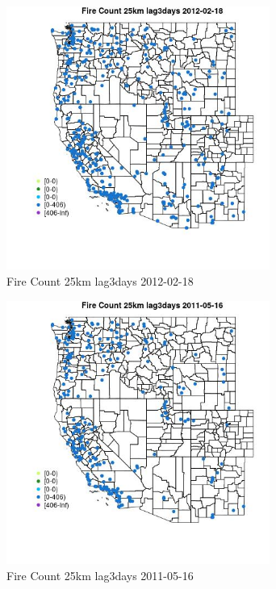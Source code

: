\begin{figure} 
\centering  
\includegraphics[width=0.77\textwidth]{Code_Outputs/Report_ML_input_PM25_Step4_part_f_de_duplicated_aveswNAs_MapObsFire_Count_25km_lag3days2012-02-18.jpg} 
\caption{\label{fig:Report_ML_input_PM25_Step4_part_f_de_duplicated_aveswNAsMapObsFire_Count_25km_lag3days2012-02-18}Fire Count 25km lag3days 2012-02-18} 
\end{figure} 
 

\begin{figure} 
\centering  
\includegraphics[width=0.77\textwidth]{Code_Outputs/Report_ML_input_PM25_Step4_part_f_de_duplicated_aveswNAs_MapObsFire_Count_25km_lag3days2011-05-16.jpg} 
\caption{\label{fig:Report_ML_input_PM25_Step4_part_f_de_duplicated_aveswNAsMapObsFire_Count_25km_lag3days2011-05-16}Fire Count 25km lag3days 2011-05-16} 
\end{figure} 
 

